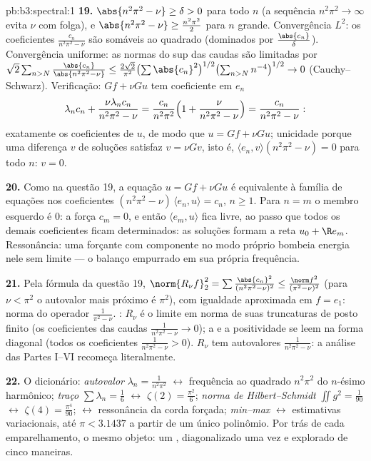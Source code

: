 \begin{solution}{pb:b3:spectral:1}
\textbf{19.} $\abs{n^2\pi^2 - \nu} \geq \delta > 0$ para todo
$n$ (a sequência $n^2\pi^2 \to \infty$ evita $\nu$ com
folga), e $\abs{n^2\pi^2 - \nu} \geq \frac{n^2\pi^2}2$
para $n$ grande. Convergência $L^2$: os coeficientes
$\frac{c_n}{n^2\pi^2 - \nu}$ são somáveis ao quadrado (dominados
por $\frac{\abs{c_n}}\delta$). Convergência uniforme: as normas do sup
das caudas são limitadas por $\sqrt2\sum_{n>N}
\frac{\abs{c_n}}{\abs{n^2\pi^2 - \nu}} \leq
\frac{2\sqrt2}{\pi^2}\bigl(\sum\abs{c_n}^2\bigr)^{1/2}
\bigl(\sum_{n>N}n^{-4}\bigr)^{1/2} \to 0$ (Cauchy--Schwarz).
Verificação: $Gf + \nu Gu$ tem coeficiente em $e_n$
\[
\lambda_nc_n + \frac{\nu\lambda_nc_n}{n^2\pi^2 - \nu}
= \frac{c_n}{n^2\pi^2}\Bigl(1 + \frac{\nu}{n^2\pi^2 -
\nu}\Bigr) = \frac{c_n}{n^2\pi^2 - \nu} :
\]
exatamente os
coeficientes de $u$, de modo que $u = Gf + \nu Gu$; unicidade
porque uma diferença $v$ de soluções satisfaz $v = \nu
Gv$, isto é, $\langle e_n, v\rangle(n^2\pi^2 - \nu) = 0$ para
todo $n$: $v = 0$.

\textbf{20.} Como na questão 19, a equação $u = Gf + \nu
Gu$ é equivalente à família de equações nos coeficientes
$(n^2\pi^2 - \nu)\,\langle e_n, u\rangle = c_n$, $n \geq
1$. Para $n = m$ o membro esquerdo é
$0$: a  força $c_m = 0$, e então $\langle e_m,
u\rangle$ fica livre, ao passo que todos os demais coeficientes ficam
determinados: as soluções formam a reta $u_0 + \R e_m$.
Ressonância: uma forçante com componente no modo próprio
bombeia energia nele sem limite --- o balanço empurrado em
sua própria frequência.

\textbf{21.} Pela fórmula da questão 19, $\norm{R_\nu f}_2^2
= \sum\frac{\abs{c_n}^2}{(n^2\pi^2 - \nu)^2} \leq
\frac{\norm f^2}{(\pi^2 - \nu)^2}$ (para $\nu < \pi^2$ o
autovalor mais próximo é $\pi^2$), com igualdade aproximada em
$f = e_1$: norma do operador $\frac1{\pi^2 - \nu}$. :
$R_\nu$ é o limite em norma de suas truncaturas de posto finito
(os coeficientes das caudas $\frac1{n^2\pi^2 - \nu} \to 0$);
a  e a positividade se leem na forma diagonal
(todos os coeficientes $\frac1{n^2\pi^2 - \nu} > 0$).
$R_\nu$ tem autovalores $\frac1{n^2\pi^2 - \nu}$: a
análise das Partes I--VI recomeça literalmente.

\textbf{22.} O dicionário: \emph{autovalor} $\lambda_n =
\frac1{n^2\pi^2}$ $\leftrightarrow$ frequência ao quadrado
$n^2\pi^2$ do $n$-ésimo harmônico; \emph{traço} $\sum
\lambda_n = \frac16$ $\leftrightarrow$ $\zeta(2) =
\frac{\pi^2}6$; \emph{norma de Hilbert--Schmidt} $\iint g^2 =
\frac1{90}$ $\leftrightarrow$ $\zeta(4) = \frac{\pi^4}{90}$;
\emph{} $\leftrightarrow$ ressonância da
corda forçada; \emph{min--max} $\leftrightarrow$
estimativas variacionais, até $\pi < 3.1437$ a partir de um único
polinômio. Por trás de cada emparelhamento, o mesmo objeto: um
 , diagonalizado uma vez e explorado
de cinco maneiras.


\end{solution}
